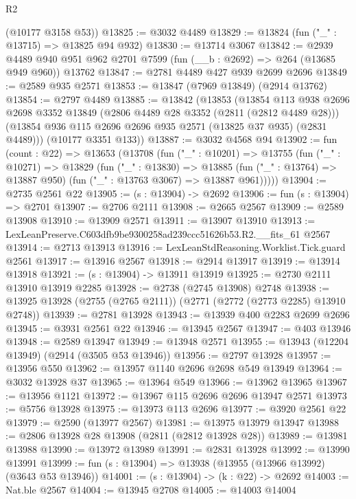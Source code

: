 \begin{lexlean}{R2}
\begin{coremodule}
      (@10177 @3158 @53))
@13825 := @3032 @4489
@13829 := @13824 (fun ("_" : @13715) => @13825 @94 @932)
@13830 := @13714 @3067
@13842 := @2939
    @4489
    @940
    @951
    @962
    @2701
    @7599
    (fun (__b : @2692) => @264 (@13685 @949 @960))
    @13762
@13847 := @2781 @4489 @427 @939 @2699 @2696
@13849 := @2589 @935 @2571
@13853 := @13847 (@7969 @13849) (@2914 @13762)
@13854 := @2797 @4489
@13885 := @13842
    (@13853
      (@13854
        @113
        @938
        @2696
        @2698
        @3352
        @13849
        (@2806 @4489 @28 @3352 (@2811 (@2812 @4489 @28)))
        (@13854 @936 @115 @2696 @2696 @935 @2571 (@13825 @37 @935) (@2831 @4489)))
      (@10177 @3351 @133))
@13887 := @3032 @4568 @94
@13902 := fun (count : @22) =>
  @13653
    (@13708
      (fun ("_" : @10201) =>
      @13755
        (fun ("_" : @10271) =>
        @13829
          (fun ("_" : @13830) =>
          @13885 (fun ("_" : @13764) => @13887 @950) (fun ("_" : @13763 @3067) => @13887 @961)))))
@13904 := @2735 @2561 @22
@13905 := (s : @13904) -> @2692
@13906 := fun (s : @13904) => @2701
@13907 := @2706 @2111
@13908 := @2665 @2567
@13909 := @2589 @13908
@13910 := @13909 @2571
@13911 := @13907 @13910
@13913 := LexLeanPreserve.C603dfb9be9300258ad239ccc51626b53.R2.__fits_61 @2567
@13914 := @2713 @13913
@13916 := LexLeanStdReasoning.Worklist.Tick.guard @2561
@13917 := @13916 @2567
@13918 := @2914 @13917
@13919 := @13914 @13918
@13921 := (s : @13904) -> @13911 @13919
@13925 := @2730 @2111 @13910 @13919 @2285
@13928 := @2738 (@2745 @13908) @2748
@13938 := @13925 @13928 (@2755 (@2765 @2111)) (@2771 (@2772 (@2773 @2285) @13910 @2748))
@13939 := @2781 @13928
@13943 := @13939 @400 @2283 @2699 @2696
@13945 := @3931 @2561 @22
@13946 := @13945 @2567
@13947 := @403 @13946
@13948 := @2589 @13947
@13949 := @13948 @2571
@13955 := @13943 (@12204 @13949) (@2914 (@3505 @53 @13946))
@13956 := @2797 @13928
@13957 := @13956 @550
@13962 := @13957 @1140 @2696 @2698 @549 @13949
@13964 := @3032 @13928 @37
@13965 := @13964 @549
@13966 := @13962 @13965
@13967 := @13956 @1121
@13972 := @13967 @115 @2696 @2696 @13947 @2571
@13973 := @5756 @13928
@13975 := @13973 @113 @2696
@13977 := @3920 @2561 @22
@13979 := @2590 (@13977 @2567)
@13981 := @13975 @13979 @13947
@13988 := @2806 @13928 @28 @13908 (@2811 (@2812 @13928 @28))
@13989 := @13981 @13988
@13990 := @13972 @13989
@13991 := @2831 @13928
@13992 := @13990 @13991
@13999 := fun (s : @13904) => @13938 (@13955 (@13966 @13992) (@3643 @53 @13946))
@14001 := (s : @13904) -> (k : @22) -> @2692
@14003 := Nat.ble @2567
@14004 := @13945 @2708
@14005 := @14003 @14004

\end{coremodule}
\end{lexlean}
